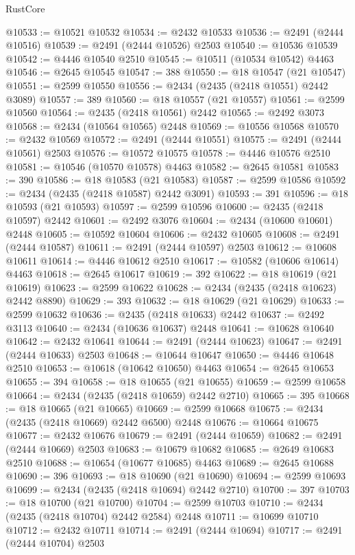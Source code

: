\begin{lexlean}{RustCore}
\begin{coremodule}
@10533 := @10521 @10532
@10534 := @2432 @10533
@10536 := @2491 (@2444 @10516)
@10539 := @2491 (@2444 @10526) @2503
@10540 := @10536 @10539
@10542 := @4446 @10540 @2510
@10545 := @10511 (@10534 @10542) @4463
@10546 := @2645 @10545
@10547 := 388
@10550 := @18 @10547 (@21 @10547)
@10551 := @2599 @10550
@10556 := @2434 (@2435 (@2418 @10551) @2442 @3089)
@10557 := 389
@10560 := @18 @10557 (@21 @10557)
@10561 := @2599 @10560
@10564 := @2435 (@2418 @10561) @2442
@10565 := @2492 @3073
@10568 := @2434 (@10564 @10565) @2448
@10569 := @10556 @10568
@10570 := @2432 @10569
@10572 := @2491 (@2444 @10551)
@10575 := @2491 (@2444 @10561) @2503
@10576 := @10572 @10575
@10578 := @4446 @10576 @2510
@10581 := @10546 (@10570 @10578) @4463
@10582 := @2645 @10581
@10583 := 390
@10586 := @18 @10583 (@21 @10583)
@10587 := @2599 @10586
@10592 := @2434 (@2435 (@2418 @10587) @2442 @3091)
@10593 := 391
@10596 := @18 @10593 (@21 @10593)
@10597 := @2599 @10596
@10600 := @2435 (@2418 @10597) @2442
@10601 := @2492 @3076
@10604 := @2434 (@10600 @10601) @2448
@10605 := @10592 @10604
@10606 := @2432 @10605
@10608 := @2491 (@2444 @10587)
@10611 := @2491 (@2444 @10597) @2503
@10612 := @10608 @10611
@10614 := @4446 @10612 @2510
@10617 := @10582 (@10606 @10614) @4463
@10618 := @2645 @10617
@10619 := 392
@10622 := @18 @10619 (@21 @10619)
@10623 := @2599 @10622
@10628 := @2434 (@2435 (@2418 @10623) @2442 @8890)
@10629 := 393
@10632 := @18 @10629 (@21 @10629)
@10633 := @2599 @10632
@10636 := @2435 (@2418 @10633) @2442
@10637 := @2492 @3113
@10640 := @2434 (@10636 @10637) @2448
@10641 := @10628 @10640
@10642 := @2432 @10641
@10644 := @2491 (@2444 @10623)
@10647 := @2491 (@2444 @10633) @2503
@10648 := @10644 @10647
@10650 := @4446 @10648 @2510
@10653 := @10618 (@10642 @10650) @4463
@10654 := @2645 @10653
@10655 := 394
@10658 := @18 @10655 (@21 @10655)
@10659 := @2599 @10658
@10664 := @2434 (@2435 (@2418 @10659) @2442 @2710)
@10665 := 395
@10668 := @18 @10665 (@21 @10665)
@10669 := @2599 @10668
@10675 := @2434 (@2435 (@2418 @10669) @2442 @6500) @2448
@10676 := @10664 @10675
@10677 := @2432 @10676
@10679 := @2491 (@2444 @10659)
@10682 := @2491 (@2444 @10669) @2503
@10683 := @10679 @10682
@10685 := @2649 @10683 @2510
@10688 := @10654 (@10677 @10685) @4463
@10689 := @2645 @10688
@10690 := 396
@10693 := @18 @10690 (@21 @10690)
@10694 := @2599 @10693
@10699 := @2434 (@2435 (@2418 @10694) @2442 @2710)
@10700 := 397
@10703 := @18 @10700 (@21 @10700)
@10704 := @2599 @10703
@10710 := @2434 (@2435 (@2418 @10704) @2442 @2584) @2448
@10711 := @10699 @10710
@10712 := @2432 @10711
@10714 := @2491 (@2444 @10694)
@10717 := @2491 (@2444 @10704) @2503

\end{coremodule}
\end{lexlean}
